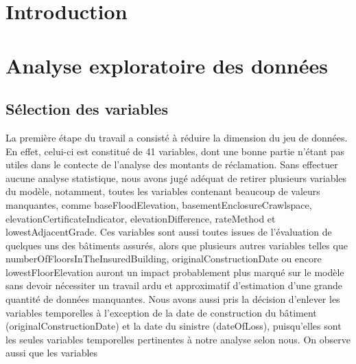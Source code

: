 \documentclass[
]{article}
\begin{document}
\centering

\clearpage

\tableofcontents

\justify  
\clearpage

\hypertarget{introduction}{%
\section{Introduction}\label{introduction}}

\hypertarget{analyse-exploratoire-des-donnuxe9es}{%
\section{Analyse exploratoire des
données}\label{analyse-exploratoire-des-donnuxe9es}}

\hypertarget{suxe9lection-des-variables}{%
\subsection{Sélection des variables}\label{suxe9lection-des-variables}}

La première étape du travail a consisté à réduire la dimension du jeu de
données. En effet, celui-ci est constitué de 41 variables, dont une
bonne partie n'étant pas utiles dans le contecte de l'analyse des
montants de réclamation. \newline \newline Sans effectuer aucune analyse
statistique, nous avons jugé adéquat de retirer plusieurs variables du
modèle, notamment, toutes les variables contenant beaucoup de valeurs
manquantes, comme baseFloodElevation, basementEnclosureCrawlspace,
elevationCertificateIndicator, elevationDifference, rateMethod et
lowestAdjacentGrade. Ces variables sont aussi toutes issues de
l'évaluation de quelques uns des bâtiments assurés, alors que plusieurs
autres variables telles que numberOfFloorsInTheInsuredBuilding,
originalConstructionDate ou encore lowestFloorElevation auront un impact
probablement plus marqué sur le modèle sans devoir nécessiter un travail
ardu et approximatif d'estimation d'une grande quantité de données
manquantes. \newline \newline Nous avons aussi pris la décision
d'enlever les variables temporelles à l'exception de la date de
construction du bâtiment (originalConstructionDate) et la date du
sinistre (dateOfLoss), puisqu'elles sont les seules variables
temporelles pertinentes à notre analyse selon nous. \newline \newline On
observe aussi que les variables
\end{document}
